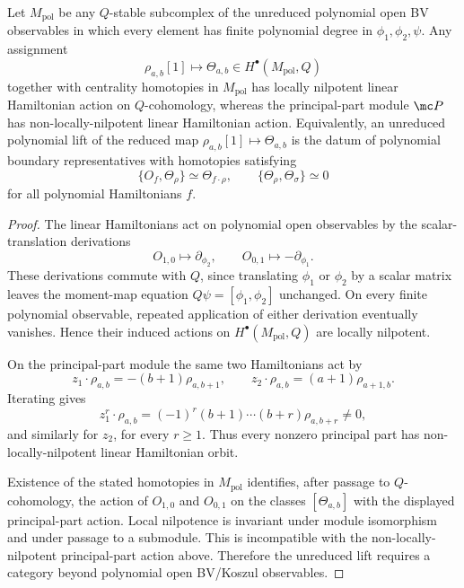 \begin{thm}
\label{thm:app-unreduced-polynomial-centrality-obstruction}
  Let \(M_{\mathrm{pol}}\) be any \(Q\)-stable subcomplex of the
  unreduced polynomial open BV observables in which every element has
  finite polynomial degree in \(\phi_1,\phi_2,\psi\).  Any assignment
  \[
    \rho_{a,b}[1]\longmapsto \Theta_{a,b}\in H^\bullet(M_{\mathrm{pol}},Q)
  \]
  together with centrality homotopies in \(M_{\mathrm{pol}}\) has locally
  nilpotent linear Hamiltonian action on \(Q\)-cohomology, whereas the
  principal-part module \(\mc P\) has non-locally-nilpotent linear
  Hamiltonian action.  Equivalently, an unreduced polynomial lift of the
  reduced map \(\rho_{a,b}[1]\mapsto\Theta_{a,b}\) is the datum of
  polynomial boundary representatives with homotopies satisfying
  \[
    \{O_f,\Theta_\rho\}\simeq\Theta_{f\cdot\rho},
    \qquad
    \{\Theta_\rho,\Theta_\sigma\}\simeq0
  \]
  for all polynomial Hamiltonians \(f\).
\end{thm}

\begin{proof}
  The linear Hamiltonians act on polynomial open observables by the
  scalar-translation derivations
  \[
    O_{1,0}\mapsto \partial_{\phi_2},\qquad
    O_{0,1}\mapsto -\partial_{\phi_1}.
  \]
  These derivations commute with \(Q\), since translating
  \(\phi_1\) or \(\phi_2\) by a scalar matrix leaves the moment-map
  equation \(Q\psi=[\phi_1,\phi_2]\) unchanged. On every finite
  polynomial observable, repeated application of either derivation
  eventually vanishes. Hence their induced actions on
  \(H^\bullet(M_{\mathrm{pol}},Q)\) are locally nilpotent.

  On the principal-part module the same two Hamiltonians act by
  \[
    z_1\cdot\rho_{a,b}=-(b+1)\rho_{a,b+1},\qquad
    z_2\cdot\rho_{a,b}=(a+1)\rho_{a+1,b}.
  \]
  Iterating gives
  \[
    z_1^r\cdot\rho_{a,b}
      =(-1)^r(b+1)\cdots(b+r)\rho_{a,b+r}\neq0,
  \]
  and similarly for \(z_2\), for every \(r\geq1\).  Thus every nonzero
  principal part has non-locally-nilpotent linear Hamiltonian orbit.

  Existence of the stated homotopies in \(M_{\mathrm{pol}}\) identifies,
  after passage to \(Q\)-cohomology, the action of \(O_{1,0}\) and \(O_{0,1}\)
  on the classes \([\Theta_{a,b}]\) with the displayed
  principal-part action.  Local nilpotence is invariant under module
  isomorphism and under passage to a submodule. This is incompatible with
  the non-locally-nilpotent principal-part action above. Therefore the
  unreduced lift requires a category beyond polynomial open BV/Koszul
  observables.
\end{proof}

